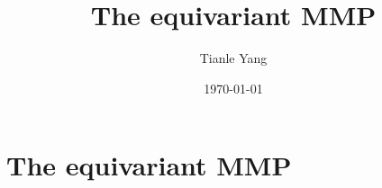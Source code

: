 \documentclass[sectionlevel=section,status=draft]{noteformyself}
\title{The equivariant MMP}
\author{Tianle Yang}
\date{\today}
\begin{document}
\maketitle

    \section[
      status=draft,
      tag=00000,
      label=\labelNFM{sec:the-decomposition-and-classification:the-equivariant-mmp}
    ]{The equivariant MMP}



\end{document}
